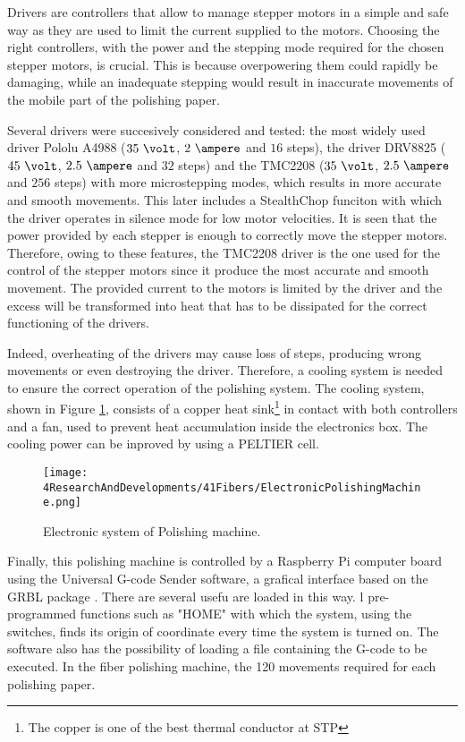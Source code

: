 \begin{enumerate}
Drivers are controllers that allow to manage stepper motors in a simple and safe way as they are used to limit the current supplied to the motors. Choosing the right controllers, with the power and the stepping mode required for the chosen stepper motors, is crucial. This is because overpowering them could rapidly be damaging, while an inadequate stepping would result in inaccurate movements of the mobile part of the polishing paper. 

Several drivers were succesively considered and tested: the most widely used driver Pololu A4988 \cite{A4988Driver} ($35~\volt$, $2~\ampere$ and $16$ steps), the driver DRV8825 ($45~\volt$, $2.5~\ampere$ and $32$ steps) and the TMC2208 \cite{TMC2208Driver} ($35~\volt$, $2.5~\ampere$ and $256$ steps) with more microstepping modes, which results in more accurate and smooth movements. This later includes a StealthChop funciton with which the driver operates in silence mode for low motor velocities. It is seen that the power provided by each stepper is enough to correctly move the stepper motors. Therefore, owing to these features, the TMC2208 driver is the one used for the control of the stepper motors since it produce the most accurate and smooth movement. The provided current to the motors is limited by the driver and the excess will be transformed into heat that has to be dissipated for the correct functioning of the drivers. 

Indeed, overheating of the drivers may cause loss of steps, producing wrong movements or even destroying the driver. Therefore, a cooling system is needed to ensure the correct operation of the polishing system. The cooling system, shown in Figure \ref{fig:ElectronicSystemPolishingMachine}, consists of a copper heat sink\footnote{The copper is one of the best thermal conductor at STP} in contact with both controllers and a fan, used to prevent heat accumulation inside the electronics box. The cooling power can be inproved by using a PELTIER cell.

\begin{figure}[h]
\centering
\texttt{[image: 4ResearchAndDevelopments/41Fibers/ElectronicPolishingMachine.png]}
\caption{Electronic system of Polishing machine.\label{fig:ElectronicSystemPolishingMachine}}
\end{figure}

\end{enumerate}

Finally, this polishing machine is controlled by a Raspberry Pi computer board \cite{RaspberryPi} using the Universal G-code Sender software, a grafical interface based on the GRBL package \cite{GRBLDocumentation}. There are several usefu are loaded in this way. 
l pre-programmed functions such as "HOME" with which the system, using the switches, finds its origin of coordinate every time the system is turned on. The software also has the possibility of loading a file containing the G-code to be executed. In the fiber polishing machine, the 120 movements required for each polishing paper.


